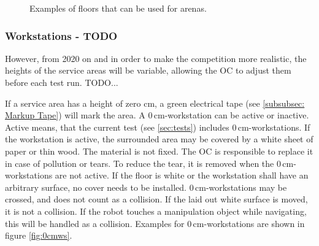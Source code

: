 \begin{figure} [h!]
\begin{center}
		 \hspace{0.1cm}
		 \hspace{0.1cm}
	\end{center}
	\caption{Examples of floors that can be used for \RCAW arenas.}
	\label{fig:example_floors}
\end{figure}


\subsubsection{Workstations - TODO}
\label{subsubsec: Workstations}

However, from 2020 on and in order to make the competition more realistic, the heights of the service areas will be variable, allowing the OC to adjust them before each test run. TODO...

If a service area has a height of zero cm, a green electrical tape (see \ref{subsubsec: Markup Tape}) will mark the area.
A $0\,\text{cm}$-workstation can be active or inactive. Active means, that the current test (see \ref{sec:tests}) includes $0\,\text{cm}$-workstations.
If the workstation is active, the surrounded area may be covered by a white sheet of paper or thin wood. The material is not fixed.
The OC is responsible to replace it in case of pollution or tears. To reduce the tear, it is removed when the $0\,\text{cm}$-workstations are not active. If the floor is white or the workstation shall have an arbitrary surface, no cover needs to be installed.
$0\,\text{cm}$-workstations may be crossed, and does not count as a collision. If the laid out white surface is moved, it is not a collision.
If the robot touches a manipulation object while navigating, this will be handled as a collision. Examples for $0\,\text{cm}$-workstations are shown in figure \ref{fig:0cmws}.

